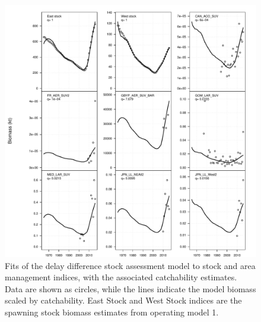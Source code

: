 \documentclass[]{article}
\begin{document}
\begin{figure}[htb]

{\centering \includegraphics[width=0.9\linewidth]{data/AM/1/indexFits} 

}

\caption{Fits of the delay difference stock assessment model to stock and area management indices, with the associated catchability estimates. Data are shown as circles, while the lines indicate the model biomass scaled by catchability. East Stock and West Stock indices are the spawning stock biomass estimates from operating model 1.}\label{fig:amIdxFitsPlot}
\end{figure}

\newpage
\end{document}
